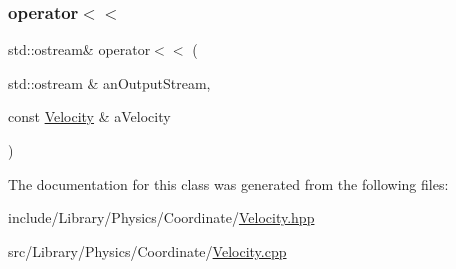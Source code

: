 \subsubsection{\texorpdfstring{operator$<$$<$}{operator<<}}
{\footnotesize\ttfamily std\+::ostream\& operator$<$$<$ (\begin{DoxyParamCaption}\item[{std\+::ostream \&}]{an\+Output\+Stream,  }\item[{const \hyperlink{classlibrary_1_1physics_1_1coord_1_1_velocity}{Velocity} \&}]{a\+Velocity }\end{DoxyParamCaption})\hspace{0.3cm}{\ttfamily [friend]}}



The documentation for this class was generated from the following files\+:\begin{DoxyCompactItemize}
\item 
include/\+Library/\+Physics/\+Coordinate/\hyperlink{_velocity_8hpp}{Velocity.\+hpp}\item 
src/\+Library/\+Physics/\+Coordinate/\hyperlink{_velocity_8cpp}{Velocity.\+cpp}\end{DoxyCompactItemize}
